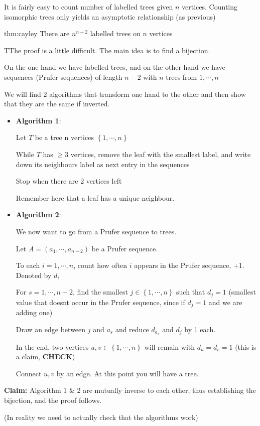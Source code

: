 \par\bigskip
\noindent It is fairly easy to count number of labelled trees given $n$ vertices. Counting isomorphic trees only yields an asymptotic relationship (as previous)
\par\bigskip
\begin{theo}[Cayley]{thm:cayley}
  There are $n^{n-2}$ labelled trees on $n$ vertices
\end{theo}
\par\bigskip
\begin{prf}
  TThe proof is a little difficult. The main idea is to find a bijection.
  \par\bigskip
  \noindent On the one hand we have labelled trees, and on the other hand we have sequences (Prufer sequences) of length $n-2$ with $n$ trees from $1,\cdots,n$ 
  \par\bigskip
  \noindent We will find 2 algorithms that transform one hand to the other and then show that they are the same if inverted.
  \par\bigskip
  \begin{itemize}
    \item \textbf{Algorithm 1}:\par
    Let $T$ be a tree n vertices $\left\{1,\cdots,n\right\}$\par
    While $T$ has $\geq3$ vertices, remove the leaf with the smallest label, and write down its neighbours label as next entry in the sequences\par
    Stop when there are 2 vertices left\par
    Remember here that a leaf has a unique neighbour.
    \par\bigskip
  \item\textbf{Algorithm 2}:\par
    We now want to go from a Prufer sequence to trees.\par
    Let $A = (a_1,\cdots,a_{n-2})$ be a Prufer sequence.\par
    To each $i = 1,\cdots, n$, count how often $i$ appears in the Prufer sequence, +1. Denoted by $d_i$\par
  For $s=1,\cdots,n-2$, find the smallest $j\in\left\{1,\cdots,n\right\}$ such that $d_j=1$ (smallest value that doesnt occur in the Prufer sequence, since if $d_j=1$ and we are adding one)\par
  Draw an edge between $j$ and $a_s$ and reduce $d_{a_s}$ and $d_j$ by 1 each.\par
  In the end, two vertices $u,v\in\left\{1,\cdots,n\right\}$ will remain with $d_u=d_v=1$ (this is a claim, \textbf{CHECK})\par
  Connect $u,v$ by an edge. At this point you will have a tree. 
  \end{itemize}
  \par\bigskip
  \noindent\textbf{Claim:} Algorithm 1 \& 2 are mutually inverse to each other, thus establishing the bijection, and the proof follows.\par
  \noindent (In reality we need to actually check that the algorithms work)
\end{prf}
